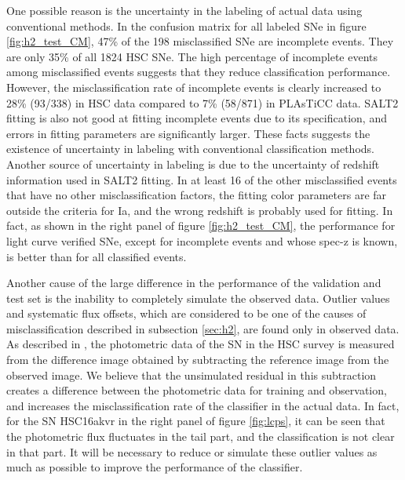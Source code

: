 \documentclass[useamsfonts]{pasj01}
\begin{document}
One possible reason is the uncertainty in the labeling of actual data using conventional methods.
In the confusion matrix for all labeled SNe in figure \ref{fig:h2_test_CM}, 47\% of the 198 misclassified SNe are incomplete events.
They are only 35\% of all 1824 HSC SNe.
The high percentage of incomplete events among misclassified events suggests that they reduce classification performance. %
However, the misclassification rate of incomplete events is clearly increased to 28\% (93/338) in HSC data compared to 7\% (58/871) in PLAsTiCC data.
SALT2 fitting is also not good at fitting incomplete events due to its specification, and errors in fitting parameters are significantly larger.
These facts suggests the existence of uncertainty in labeling with conventional classification methods.
Another source of uncertainty in labeling is due to the uncertainty of redshift information used in SALT2 fitting.
In at least 16 of the other misclassified events that have no other misclassification factors, the fitting color parameters are far outside the criteria for Ia, and the wrong redshift is probably used for fitting.
In fact, as shown in the right panel of figure \ref{fig:h2_test_CM}, the performance for light curve verified SNe, except for incomplete events and whose spec-z is known, is better than for all classified events.

Another cause of the large difference in the performance of the validation and test set is the inability to completely simulate the observed data.
Outlier values and systematic flux offsets, which are considered to be one of the causes of misclassification described in subsection \ref{sec:h2}, are found only in observed data.
As described in \citet{yasuda19a}, the photometric data of the SN in the HSC survey is measured from the difference image obtained by subtracting the reference image from the observed image.
We believe that the unsimulated residual in this subtraction creates a difference between the photometric data for training and observation, and increases the misclassification rate of the classifier in the actual data.
In fact, for the SN HSC16akvr in the right panel of figure \ref{fig:lcps}, it can be seen that the photometric flux fluctuates in the tail part, and the classification is not clear in that part.
It will be necessary to reduce or simulate these outlier values as much as possible to improve the performance of the classifier.
%
%
%
\end{document}
